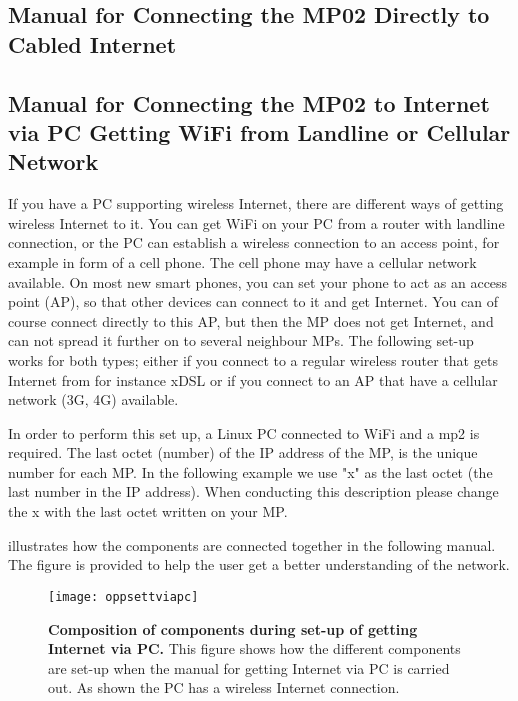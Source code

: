 \subsection{Manual for Connecting the MP02 Directly to Cabled Internet}
\label{subsec:cabledInternet}

\clearpage
\subsection{Manual for Connecting the MP02 to Internet via PC Getting WiFi from Landline or Cellular Network}
\label{subsec:internetviaPC}

If you have a PC supporting wireless Internet, there are different ways of getting wireless Internet to it. You can get WiFi on your PC from a router with landline connection, or the PC can establish a wireless connection to an access point, for example in form of a cell phone. The cell phone may have a cellular network available. On most new smart phones, you can set your phone to act as an access point (AP), so that other devices can connect to it and get Internet. You can of course connect directly to this AP, but then the MP does not get Internet, and can not spread it further on to several neighbour MPs. The following set-up works for both types; either if you connect to a regular wireless router that gets Internet from for instance xDSL or if you connect to an AP that have a cellular network (3G, 4G) available. 

In order to perform this set up, a Linux PC connected to WiFi and a \gls{mp2} is required. The last octet (number) of the IP address of the MP, is the unique number for each MP. In the following example we use "x" as the last octet (the last number in the IP address). When conducting this description please change the x with the last octet written on your MP.

 illustrates how the components are connected together in the following manual. The figure is provided to help the user get a better understanding of the network. 

\begin{figure}[h!]
  \centering
      \texttt{[image: oppsettviapc]}
  \caption [Composition of components during set-up of getting Internet via PC]{\textbf{Composition of components during set-up of getting Internet via PC.} This figure shows how the different components are set-up when the manual for getting Internet via PC is carried out. As shown the PC has a wireless Internet connection.}
  \label{fig:oppsettviapc}
\end{figure}

